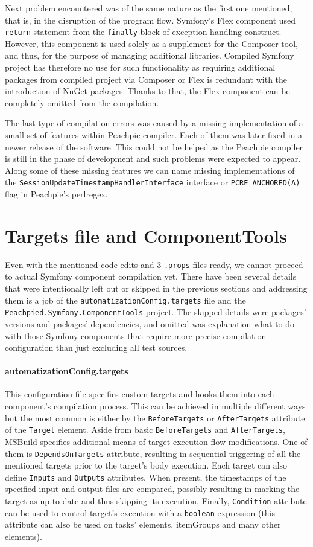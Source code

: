 Next problem encountered was of the same nature as the first one mentioned, that is, in the disruption of the program flow. Symfony's Flex component used \texttt{return} statement from the \texttt{finally} block of exception handling construct. However, this component is used solely as a supplement for the Composer tool, and thus, for the purpose of managing additional libraries. Compiled Symfony project has therefore no use for such functionality as requiring additional packages from compiled project via Composer or Flex is redundant with the introduction of NuGet packages. Thanks to that, the Flex component can be completely omitted from the compilation.

The last type of compilation errors was caused by a missing implementation of a small set of features within Peachpie compiler. Each of them was later fixed in a newer release of the software. This could not be helped as the Peachpie compiler is still in the phase of development and such problems were expected to appear. Along some of these missing features we can name missing implementations of the \texttt{SessionUpdateTimestampHandlerInterface} interface or \texttt{PCRE\_ANCHORED(A)} flag in Peachpie's perlregex. 


\section{Targets file and ComponentTools}
Even with the mentioned code edits and 3 \texttt{.props} files ready, we cannot proceed to actual Symfony component compilation yet. There have been several details that were intentionally left out or skipped in the previous sections and addressing them is a job of the \texttt{automatizationConfig.targets} file and the \texttt{Peachpied.Symfony.ComponentTools} project. The skipped details were packages' versions and packages' dependencies, and omitted was explanation what to do with those Symfony components that require more precise compilation configuration than just excluding all test sources.

\paragraph{automatizationConfig.targets} This configuration file specifies custom targets and hooks them into each component's compilation process. This can be achieved in multiple different ways but the most common is either by the \texttt{BeforeTargets} or \texttt{AfterTargets} attribute of the \texttt{Target} element. Aside from basic \texttt{BeforeTargets} and \texttt{AfterTargets}, MSBuild specifies additional means of target execution flow modifications. One of them is \texttt{DependsOnTargets} attribute, resulting in sequential triggering of all the mentioned targets prior to the target's body execution. Each target can also define \texttt{Inputs} and \texttt{Outputs} attributes. When present, the timestamps of the specified input and output files are compared, possibly resulting in marking the target as up to date and thus skipping its execution. Finally, \texttt{Condition} attribute can be used to control target's execution with a \texttt{boolean} expression (this attribute can also be used on tasks' elements, itemGroups and many other elements).

